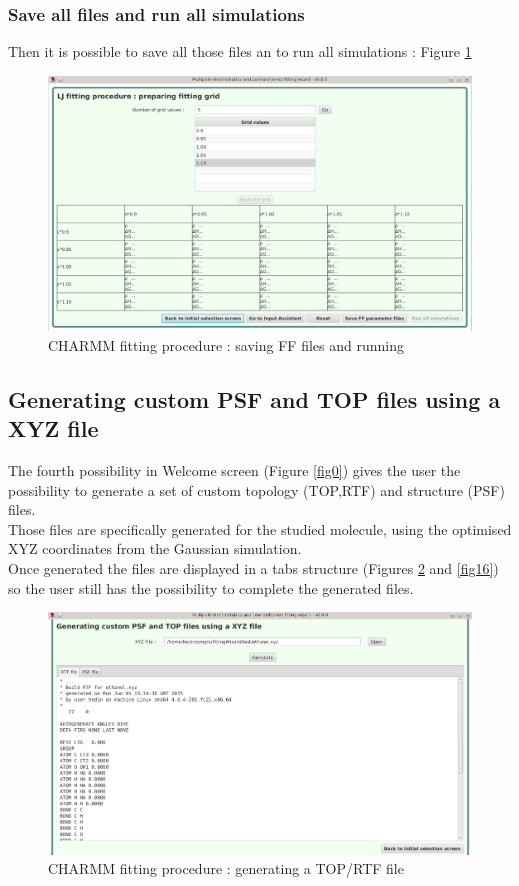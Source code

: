 \documentclass[12pt,a4paper]{article}
\begin{document}
\subsubsection{Save all files and run all simulations}

Then it is possible to save all those files an to run all simulations : Figure \ref{fig11}

\begin{figure}[h!]
\centering
\includegraphics[width=0.9\linewidth]{pics/scr11}
\caption{CHARMM fitting procedure : saving FF files and running}
\label{fig11}
\end{figure}

\clearpage

\subsection{Generating custom PSF and TOP files using a XYZ file}

The fourth possibility in Welcome screen (Figure \ref{fig0}) gives the user the possibility to 
generate a set of custom topology (TOP,RTF) and structure (PSF) files.\\

Those files are specifically generated for the studied molecule, using the optimised XYZ 
coordinates from the Gaussian simulation.\\

Once generated the files are displayed in a tabs structure (Figures \ref{fig15} and \ref{fig16})
so the user still has the possibility to complete the generated files.

\begin{figure}[h!]
\centering
\includegraphics[width=0.9\linewidth]{pics/scr15}
\caption{CHARMM fitting procedure : generating a TOP/RTF file}
\label{fig15}
\end{figure}
\end{document}
